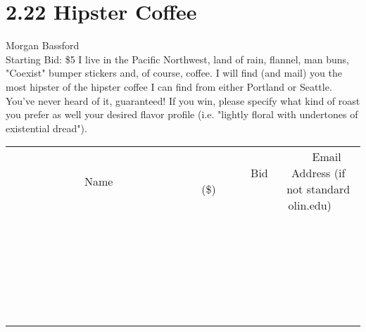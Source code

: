 \documentclass[11pt]{article}
\begin{document}
\section*{2.22 Hipster Coffee}
Morgan Bassford
\\
Starting Bid: \$5
\newline
I live in the Pacific Northwest, land of rain, flannel, man buns, "Coexist" bumper stickers and, of course, coffee. I will find (and mail) you the most hipster of the hipster coffee I can find from either Portland or Seattle. You've never heard of it, guaranteed! If you win, please specify what kind of roast you prefer as well your desired flavor profile (i.e. "lightly floral with undertones of existential dread").
\\[6ex]
\begin{tabular}{c c c}
~~~~~~~~~~~~~Name~~~~~~~~~~~~~ & ~~~~~~~~~Bid (\$)~~~~~~~~~  & ~~~Email Address (if not standard olin.edu)~~~\\
 & & \\
\hline
 & & \\
\hline
 & & \\
\hline
 & & \\
\hline
 & & \\
\hline
 & & \\
\hline
 & & \\
\hline
 & & \\
\hline
 & & \\
\hline
 & & \\
\hline
 & & \\
\hline
 & & \\
\hline
 & & \\
\hline
 & & \\
\hline
 & & \\
\hline
 & & \\
\hline
 & & \\
\hline
 & & \\
\hline
 & & \\
\hline
 & & \\
\hline
 & & \\
\hline
 & & \\
\hline
 & & \\
\hline
 & & \\
\hline
 & & \\
\hline
 & & \\
\hline
\end{tabular}
\newpage
\end{document}
